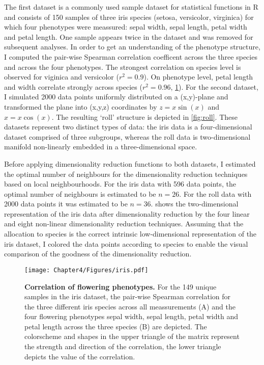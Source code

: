 The first dataset is a commonly used sample dataset for statistical functions in R and consists of \num{150} samples of three iris species (setosa, versicolor, virginica) for which four phenotypes were meassured:  sepal width, sepal length, petal width and petal length. One sample appears twice in the dataset and was removed for subsequent analyses. In order to get an understanding of the phenotype structure, I computed the pair-wise Spearman correlation coefficent across the three species and across the four phenotypes. The strongest correlation on species level is observed for viginica and versicolor (\(r^2=0.9\)). On phenotype level, petal length and width correlate strongly across species (\(r^2=0.96\), \cref{fig:iris}). For the second dataset, I simulated \num{2000} data points uniformly distributed on a (x,y)-plane and transformed the plane into (x,y,z) coordinates by \(z = x \sin(x)\) and \(x = x \cos(x)\). The resulting `roll' structure is depicted in \cref{fig:roll}. These datasets represent two distinct types of data: the iris data is a four-dimensional dataset comprised of three subgroups, whereas the roll data is two-dimensional manifold non-linearly embedded in a three-dimensional space. 

Before applying dimensionality reduction functions to both datasets, I estimated the optimal number of neighbours for the dimensionality reduction techniques based on local neighbourhoods. For the iris data with \num{596} data points, the optimal number of neighbours is estimated to be \(n=26\). For the roll data with \num{2000} data points it was estimated to be \(n=36\).  shows the two-dimensional representation of the iris data after dimensionality reduction by the four linear and eight non-linear dimensionality reduction techniques. Assuming that the allocation to species is the correct intrinsic low-dimensional representation of the iris dataset, I colored the data points according to species to enable the visual comparison of the goodness of the dimensionality reduction.

\begin{figure}[h]
	\centering
			\texttt{[image: Chapter4/Figures/iris.pdf]}		
	\caption[\textbf{Correlation of flowering phenotypes.} Generated via R function \textit{corrplot::corrplot}]{\textbf{Correlation of flowering phenotypes.} For the \num{149} unique samples in the iris dataset, the pair-wise Spearman correlation for the three different iris species across all meassurements (A) and the four flowering phenotypes sepal width, sepal length, petal width and petal length across the three species (B) are depicted. The colorscheme and shapes in the upper triangle of the matrix represent the strength and direction of the correlation, the lower triangle depicts the value of the correlation.} 
		\label{fig:iris}
\end{figure}%

